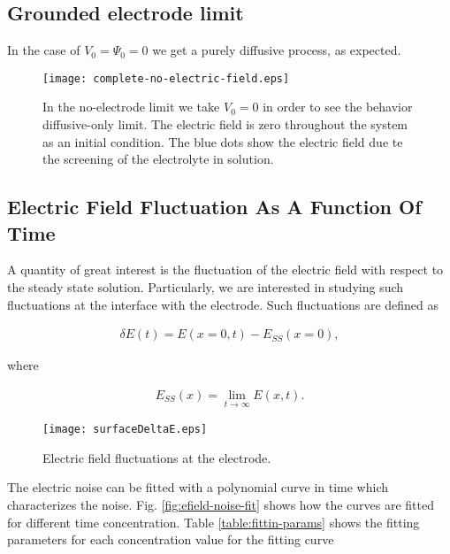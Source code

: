 \newpage
\subsection{Grounded electrode limit}

In the case of $V_0 = \Psi_0 = 0$ we get a purely diffusive process, as expected. 

\begin{figure}[htbp]
\centering
\texttt{[image: complete-no-electric-field.eps]}
\caption{In the no-electrode limit we take $V_0=0$ in order to see the behavior diffusive-only limit. The electric field is zero throughout the system as an initial condition. The blue dots show the electric field due te the screening of the electrolyte in solution. }
\label{fig:nernts-no-field}
\end{figure}


\newpage
\subsection{Electric Field Fluctuation As A Function Of Time}


A quantity of great interest is the fluctuation of the electric field with respect to the steady state solution. Particularly, we are interested in studying such fluctuations at the interface with the electrode. Such fluctuations are defined as

\begin{align}
	\delta E(t) = E(x=0, t) - E_{SS}(x=0), 
\end{align}

where 

\begin{align}
	E_{SS}(x) = \lim_{t\rightarrow\infty} E(x,t).
\end{align}



\begin{figure}[htbp]
\centering
\texttt{[image: surfaceDeltaE.eps]}
\caption{Electric field fluctuations at the electrode.}
\end{figure}

\newpage

The electric noise can be fitted with a polynomial curve in time which characterizes the noise. Fig. \ref{fig:efield-noise-fit} shows how the curves are fitted for different time concentration. Table \ref{table:fittin-params} shows the fitting parameters for each concentration value for the fitting curve

